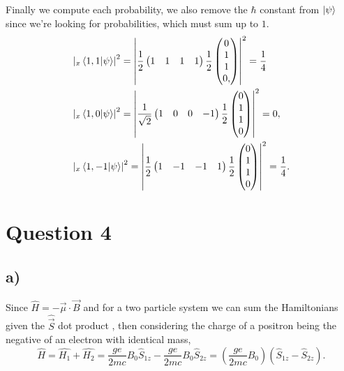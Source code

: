\documentclass[12pt]{article}
\theoremstyle{definition}
\theoremstyle{definition}
\theoremstyle{definition}
\theoremstyle{definition}
\theoremstyle{definition}
\theoremstyle{example}
\theoremstyle{note}
\theoremstyle{remark}
\theoremstyle{example}
\begin{document}
 				Finally we compute each probability, we also remove the $\hbar$ constant from $\ket{\psi}$ since we're looking for probabilities, which must sum up to $1$. 
 				\begin{align*}
 					&\abs{_{x} \braket{1,1}{\psi}}^{2} = \abs{\frac12 \begin{pmatrix}
 						1 & 1 & 1 &1
 						\end{pmatrix} \frac12 \begin{pmatrix}
 						 	0 \\ 1 \\ 1 \\ 0 ,
 						\end{pmatrix}}^{2} = \frac14 \\
 					&\abs{_{x} \braket{1,0}{\psi}}^{2} = \abs{\frac{1}{\sqrt{2}} \begin{pmatrix}
 						1 & 0 & 0 & -1
 						\end{pmatrix} \frac12 \begin{pmatrix}
 							0 \\ 1 \\ 1 \\0
 						\end{pmatrix}}^{2} = 0, \\
 					&\abs{_{x} \braket{1,-1}{\psi}}^{2} = \abs{\frac12 \begin{pmatrix}
 						1 & -1 & -1 & 1
 						\end{pmatrix} \frac12 \begin{pmatrix}
 						 0 \\ 1 \\ 1 \\ 0
 						\end{pmatrix}}^{2} = \frac14.
 				\end{align*} 
 			\section*{Question 4}
 				\subsection*{a) }
 					Since $\hat{H} = - \vec{\mu} \cdot \vec{B}$ and for a two particle system we can sum the Hamiltonians given the $\hat{\vec{S}}$ dot product , then considering the charge of a positron being the negative of an electron with identical mass, 
 					$$ \hat{H} = \hat{H_{1}} + \hat{H_{2}} = \frac{ge}{2mc} B_{0} \hat{S}_{1z} - \frac{ge}{2mc}B_{0} \hat{S}_{2z} = \left(\frac{ge}{2mc}B_{0}\right)(\hat{S}_{1z} - \hat{S}_{2z}).$$
\end{document}
